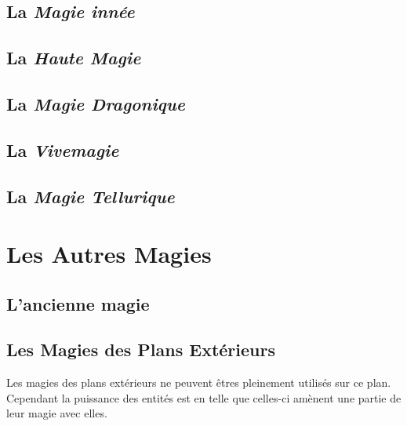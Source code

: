 \subsection{La {\em Magie innée}}
\subsection{La {\em Haute Magie}}

\subsection{La {\em Magie Dragonique}}

\subsection{La {\em Vivemagie}}
\subsection{La {\em Magie Tellurique}}
\section{Les Autres Magies}
\subsection{L'ancienne magie}
\subsection{Les Magies des Plans Extérieurs}
Les magies des plans extérieurs ne peuvent êtres pleinement utilisés sur ce plan.
Cependant la puissance des entités est en telle que celles-ci amènent une partie de leur magie avec elles.
